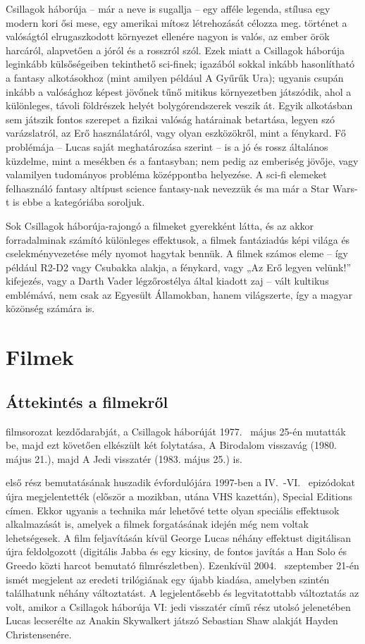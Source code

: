 \documentclass[a4paper,12pt,twoside]{report}
\theoremstyle{definition}
\begin{document}
	\Az Csillagok háborúja -- már a neve is sugallja -- egy afféle legenda, stílusa egy modern kori ősi mese, egy amerikai mítosz létrehozását célozza meg. \Az történet a valóságtól elrugaszkodott környezet ellenére nagyon is valós, az ember örök harcáról, alapvetően a jóról és a rosszról szól. Ezek miatt a Csillagok háborúja leginkább külsőségeiben tekinthető sci-finek; igazából sokkal inkább hasonlítható a fantasy alkotásokhoz (mint amilyen például A Gyűrűk Ura); ugyanis csupán inkább a valósághoz képest jövőnek tűnő mitikus környezetben játszódik, ahol a különleges, távoli földrészek helyét bolygórendszerek veszik át. Egyik alkotásban sem játszik fontos szerepet a fizikai valóság határainak betartása, legyen szó varázslatról, az Erő használatáról, vagy olyan eszközökről, mint a fénykard. Fő problémája -- Lucas saját meghatározása szerint -- is a jó és rossz általános küzdelme, mint a mesékben és a fantasyban; nem pedig az emberiség jövője, vagy valamilyen tudományos probléma középpontba helyezése. A sci-fi elemeket felhasználó fantasy altípust science fantasy-nak nevezzük és ma már a Star Wars-t is ebbe a kategóriába soroljuk.
	
	Sok Csillagok háborúja-rajongó a filmeket gyerekként látta, és az akkor forradalminak számító különleges effektusok, a filmek fantáziadús képi világa és cselekményvezetése mély nyomot hagytak bennük. A filmek számos eleme -- így például R2-D2 vagy Csubakka alakja, a fénykard, vagy „Az Erő legyen velünk!” kifejezés, vagy a Darth Vader légzőrostélya által kiadott zaj -- vált kultikus emblémává, nem csak az Egyesült Államokban, hanem világszerte, így a magyar közönség számára is. 

	\chapter{Filmek}\label{fej-filmek}
	\section{Áttekintés a filmekről}
	\Az filmsorozat kezdődarabját, a Csillagok háborúját 1977.~ május 25-én mutatták be, majd ezt követően elkészült két folytatása, A Birodalom visszavág (1980. május 21.), majd A Jedi visszatér (1983. május 25.) is.
	
	\cite{cimke}\Az első rész bemutatásának huszadik évfordulójára 1997-ben a IV.~-VI.~ epizódokat újra megjelentették (először a mozikban, utána VHS kazettán), Special Editions címen. Ekkor ugyanis a technika már lehetővé tette olyan speciális effektusok alkalmazását is, amelyek a filmek forgatásának idején még nem voltak lehetségesek. A film feljavításán kívül George Lucas néhány effektust digitálisan újra feldolgozott (digitális Jabba és egy kicsiny, de fontos javítás a Han Solo és Greedo közti harcot bemutató filmrészletben). Ezenkívül 2004.~ szeptember 21-én ismét megjelent az eredeti trilógiának egy újabb kiadása, amelyben szintén találhatunk néhány változtatást. A legjelentősebb és legvitatottabb változtatás az volt, amikor a Csillagok háborúja VI: \Az jedi visszatér című rész utolsó jelenetében Lucas lecserélte az Anakin Skywalkert játszó Sebastian Shaw alakját Hayden Christensenére.
	
\end{document}
